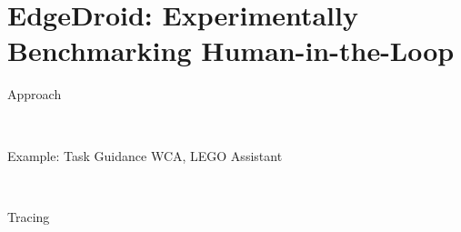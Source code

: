 \documentclass[aspectratio=1610]{beamer}
\begin{document}
\section{EdgeDroid: Experimentally Benchmarking Human-in-the-Loop}

\begin{frame}{Approach}
    \begin{center}
        \\%
        \vspace{.1\textheight}%
    \end{center}
\end{frame}

\begin{frame}{Example: Task Guidance WCA, LEGO Assistant\ \autocite{Ha:TowardsWearableCogAssist}}
    \begin{center}
        \\
    \end{center}
\end{frame}

\begin{frame}{Tracing}
    \begin{center}
        \\
        \vspace{.1\textheight}%
        \\
    \end{center}
\end{frame}
\end{document}
